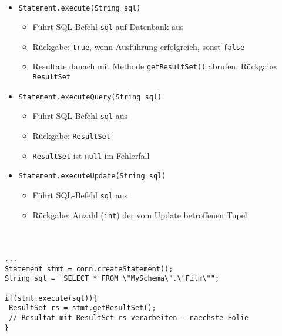 \begin{frame}[t]
\frametitle{\insertsection}
\framesubtitle{\insertsubsection}
\onslide
{}\\[8pt]
\begin{itemize}
	\item \texttt{Statement.execute(String sql)}
	\begin{itemize}
		\item F\"uhrt SQL-Befehl \texttt{sql} auf Datenbank aus
		\item Rückgabe: \texttt{true}, wenn Ausf\"uhrung erfolgreich, sonst \texttt{false}
		\item Resultate danach mit Methode \texttt{getResultSet()} abrufen. R\"uckgabe: \texttt{ResultSet}
	\end{itemize}
	\pause 
	\item \texttt{Statement.executeQuery(String sql)}
	\begin{itemize}
		\item F\"uhrt SQL-Befehl \texttt{sql} aus 
		\item R\"uckgabe: \texttt{ResultSet} 
		\item \texttt{ResultSet} ist \texttt{null} im Fehlerfall
	\end{itemize}
	\pause 
	\item \texttt{Statement.executeUpdate(String sql)}
	\begin{itemize}
		\item F\"uhrt SQL-Befehl \texttt{sql} aus
		\item R\"uckgabe: Anzahl (\texttt{int}) der vom Update betroffenen Tupel
	\end{itemize}
\end{itemize}
\end{frame}

\begin{frame}[fragile]
\frametitle{\insertsection}
\framesubtitle{\insertsubsection}
\\[4pt]
\lstset{language=Java}
\begin{lstlisting}[xleftmargin=3ex, numbers=none, showstringspaces=false]
...
Statement stmt = conn.createStatement(); 
String sql = "SELECT * FROM \"MySchema\".\"Film\"";

if(stmt.execute(sql)){
 ResultSet rs = stmt.getResultSet(); 
 // Resultat mit ResultSet rs verarbeiten - naechste Folie
} 
\end{lstlisting}
\end{frame}

